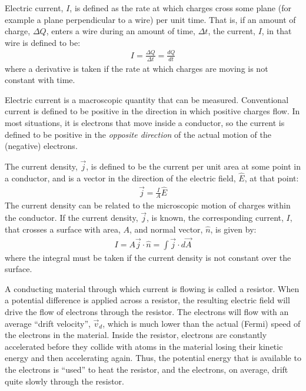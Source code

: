 \begin{chapterSummary}
Electric current, $I$, is defined as the rate at which charges cross some plane (for example a plane perpendicular to a wire) per unit time. That is, if an amount of charge, $\Delta Q$, enters a wire during an amount of time, $\Delta t$, the current, $I$, in that wire is defined to be:
\begin{align*}
I=\frac{\Delta Q}{\Delta t}=\frac{dQ}{dt}
\end{align*}
where a derivative is taken if the rate at which charges are moving is not constant with time.

Electric current is a macroscopic quantity that can be measured. Conventional current is defined to be positive in the direction in which positive charges flow. In most situations, it is electrons that move inside a conductor, so the current is defined to be positive in the \textit{opposite direction} of the actual motion of the (negative) electrons.

The current density, $\vec j$, is defined to be the current per unit area at some point in a conductor, and is a vector in the direction of the electric field, $\hat E$, at that point:
\begin{align*}
\vec j = \frac{I}{A}\hat E
\end{align*}
The current density can be related to the microscopic motion of charges within the conductor. If the current density, $\vec j$, is known, the corresponding current, $I$, that crosses a surface with area, $A$, and normal vector, $\hat n$, is given by:
\begin{align*}
I=A \vec j\cdot \hat n=\int \vec j \cdot d\vec A
\end{align*}
where the integral must be taken if the current density is not constant over the surface.

A conducting material through which current is flowing is called a resistor. When a potential difference is applied across a resistor, the resulting electric field will drive the flow of electrons through the resistor. The electrons will flow with an average ``drift velocity'', $\vec v_d$, which is much lower than the actual (Fermi) speed of the electrons in the material. Inside the resistor, electrons are constantly accelerated before they collide with atoms in the material losing their kinetic energy and then accelerating again. Thus, the potential energy that is available to the electrons is ``used'' to heat the resistor, and the electrons, on average, drift quite slowly through the resistor.


\end{chapterSummary}
